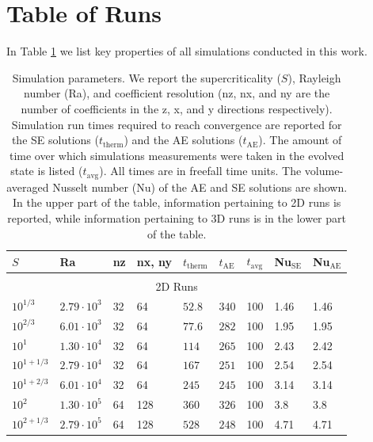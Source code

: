 \documentclass[aps, pre, onecolumn, nofootinbib, notitlepage, groupedaddress, amsfonts, amssymb, amsmath, longbibliography]{revtex4-1}
\begin{document}
\appendix
\section{Table of Runs}
\label{appendix:run_table}
In Table \ref{table:run_parameters} we list key properties of all simulations
conducted in this work.  
\begin{table}
\caption{Simulation parameters. We report the supercriticality ($S$), Rayleigh number (Ra), 
and coefficient resolution (nz, nx, and ny are the number of coefficients in the
z, x, and y directions respectively).
Simulation run times required to reach convergence
are reported for the SE solutions ($t_{\text{therm}}$) and the AE solutions ($t_{\text{AE}}$).
The amount of time over which simulations measurements were taken in the evolved
state is listed ($t_{\text{avg}}$). All times are in freefall time units.  
The volume-averaged Nusselt number (Nu) of the
AE and SE solutions are shown.
In the upper part of the table, information pertaining to 2D runs is reported,
while information pertaining to 3D runs is in the lower part of the table.
}
\label{table:run_parameters}
\begin{center}
\begin{tabularx}{\textwidth}{ X X X X | X X X | X X }
\hline																	
$S$	&	Ra	&	nz	&	nx, ny	&	$t_{\text{therm}}$	&	$t_{\text{AE}}$	&	$t_{\text{avg}}$	&	Nu$_{\text{SE}}$	&	Nu$_{\text{AE}}$	\\
\hline \hline \multicolumn{9}{c}{\vspace{-0.2cm}}\\
\multicolumn{9}{c}{\vspace{0.1cm}2D Runs} \\
\hline
$10^{1/3}$	&	$2.79 \cdot 10^3$	&	32	&	64	&	$52.8$	&	$340$	&	100	&	1.46	&	1.46	\\
$10^{2/3}$	&	$6.01 \cdot 10^3$	&	32	&	64	&	$77.6$	&	$282$	&	100	&	1.95	&	1.95	\\
$10^1$	&	$1.30 \cdot 10^4$	&	32	&	64	&	$114$	&	$265$	&	100	&	2.43	&	2.42	\\
$10^{1 + 1/3}$	&	$2.79 \cdot 10^4$	&	32	&	64	&	$167$	&	$251$	&	100	&	2.54	&	2.54	\\
$10^{1 + 2/3}$	&	$6.01 \cdot 10^4$	&	32	&	64	&	$245$	&	$245$	&	100	&	3.14	&	3.14	\\
$10^2$	&	$1.30 \cdot 10^5$	&	64	&	128	&	$360$	&	$326$	&	100	&	3.8	&	3.8	\\
$10^{2 + 1/3}$	&	$2.79 \cdot 10^5$	&	64	&	128	&	$528$	&	$248$	&	100	&	4.71	&	4.71	\\

\end{tabularx}
\end{center}
\end{table}
\end{document}
